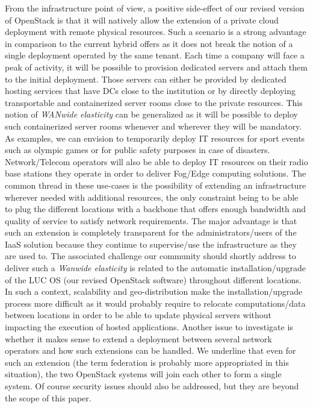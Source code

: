 From the infrastructure point of view, a positive side-effect of our revised version of OpenStack is that it will natively allow the extension of a
private cloud deployment with remote physical resources. Such a scenario is a strong advantage in comparison to the current hybrid offers as it does
not break the notion of a single deployment operated by the same tenant. Each time a company will face a peak of activity, it will be possible to
provision dedicated servers and attach them to the initial deployment. Those servers can either be provided by dedicated hosting services that have
DCs close to the institution or by directly deploying transportable and containerized server rooms close to the private resources. This notion of
\emph{WANwide elasticity} can be generalized as it will be possible to deploy such containerized server rooms whenever and wherever they will be
mandatory. As examples, we can envision to temporarily deploy IT resources for sport events such as olympic games or for public safety purposes in
case of disasters. Network/Telecom operators will also be able to deploy IT resources on their radio base stations they operate in order to deliver
Fog/Edge computing solutions. The common thread in these use-cases is the possibility of extending an infrastructure wherever needed with additional
resources, the only constraint being to be able to plug the different locations with a backbone that offers enough bandwidth and quality of service to
satisfy network requirements. The major advantage is that such an extension is completely transparent for the administrators/users of the IaaS
solution because they continue to supervise/use the infrastructure as they are used to. The associated challenge our community should shortly address
to deliver such a \emph{Wanwide elasticity} is related to the automatic installation/upgrade of the LUC OS (\ie our revised OpenStack software)
throughout different locations. In such a context, scalability and geo-distribution make the installation/upgrade process more difficult as it
would probably require to relocate computations/data between locations in order to be able to update physical servers without impacting the execution
of hosted applications. Another issue to investigate is whether it makes sense to extend a deployment between several network operators and how such
extensions can be handled. We underline that even for such an extension (the term federation is probably more appropriated in this situation), the two
OpenStack systems will join each other to form a single system. Of course security issues should also be addressed, but they are beyond the scope of this
paper.

